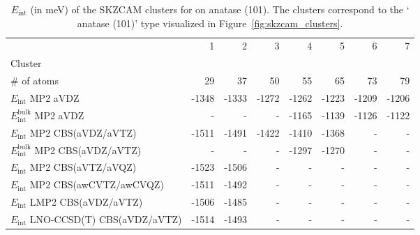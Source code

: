 \begin{table}
\caption{\label{tab:system_eint_a-tio2_nh3}$E_\textrm{int}$ (in meV) of the SKZCAM clusters for  on  anatase (101). The clusters correspond to the ` anatase (101)' type visualized in Figure~\ref{fig:skzcam_clusters}.}
\begin{adjustbox}{center,max width=1.4\textwidth}
\begin{tabular}{lrrrrrrr}
\toprule
 & 1 & 2 & 3 & 4 & 5 & 6 & 7 \\ 
Cluster &  &  &  &  &  &  &  \\
\midrule
\# of atoms & 29 & 37 & 50 & 55 & 65 & 73 & 79 \\
$E_\textrm{int}$ MP2 aVDZ & -1348 & -1333 & -1272 & -1262 & -1223 & -1209 & -1206 \\
$E_\textrm{int}^\textrm{bulk}$ MP2 aVDZ & - & - & - & -1165 & -1139 & -1126 & -1122 \\
$E_\textrm{int}$ MP2 CBS(aVDZ/aVTZ) & -1511 & -1491 & -1422 & -1410 & -1368 & - & - \\
$E_\textrm{int}^\textrm{bulk}$ MP2 CBS(aVDZ/aVTZ) & - & - & - & -1297 & -1270 & - & - \\
$E_\textrm{int}$ MP2 CBS(aVTZ/aVQZ) & -1523 & -1506 & - & - & - & - & - \\
$E_\textrm{int}$ MP2 CBS(awCVTZ/awCVQZ) & -1511 & -1492 & - & - & - & - & - \\
$E_\textrm{int}$ LMP2 CBS(aVDZ/aVTZ) & -1506 & -1485 & - & - & - & - & - \\
$E_\textrm{int}$ LNO-CCSD(T) CBS(aVDZ/aVTZ) & -1514 & -1493 & - & - & - & - & - \\
\bottomrule
\end{tabular}
\end{adjustbox}
\end{table}
